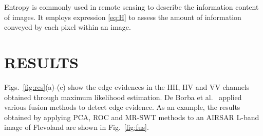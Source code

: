 \documentclass{article}
\begin{document}
Entropy is commonly used in remote sensing to describe the information content of images. It employs expression \eqref{eq:H}  to assess the amount of information conveyed by each pixel within an image. 

\vspace{-0.2cm}
\section{RESULTS}
\vspace{-0.2cm}
Figs.~\ref{fig:res}(a)-(c) show the edge evidences in the HH, HV and VV channels obtained through maximum likelihood estimation.
De Borba et al.~\cite{DeBorba2020} applied various fusion methods to detect edge evidence. 
As an example, the results obtained by applying PCA, ROC and MR-SWT methods to an AIRSAR L-band image of Flevoland are shown in Fig.~\ref{fig:fus}.%
\end{document}

